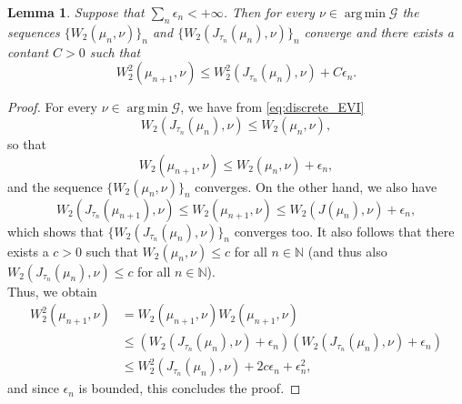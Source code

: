 \documentclass[11pt]{article}
\DeclareMathOperator*{\argmin}{arg\,min}
\newtheorem{lemma}[theorem]{Lemma}
\newcommand{\cG}{\mathcal{G}}
\newcommand{\N}{\mathbb{N}}
\numberwithin{equation}{section}
\begin{document}
\begin{lemma}\label{lem:bounded_sequences}
	Suppose that $\sum_n \epsilon_n < +\infty$. Then for every $\nu \in \argmin \cG$ the sequences $\{W_2(\mu_n,\nu)\}_n$ and $\{W_2(J_{\tau_n}(\mu_n),\nu)\}_n$ converge and there exists a contant $C>0$ such that
	\begin{equation}\label{eq:square_inequality}
		W_2^2(\mu_{n+1},\nu)\leq W_2^2(J_{\tau_n}(\mu_n),\nu)+C\epsilon_n.
	\end{equation}
\end{lemma}
\begin{proof}
	For every $\nu \in \argmin \cG$, we have from \eqref{eq:discrete_EVI} \[W_2(J_{\tau_n}(\mu_n),\nu)\leq  W_2(\mu_n,\nu),\] so that
	\[W_2(\mu_{n+1},\nu)\leq W_2(\mu_n,\nu) + \epsilon_n,\]
	and the sequence $\{W_2(\mu_n,\nu)\}_n$ converges. On the other hand, we also have
	\[W_2(J_{\tau_n}(\mu_{n+1}),\nu)\leq W_2(\mu_{n+1},\nu)\leq W_2(J(\mu_{n}),\nu)+\epsilon_{n},\]
	which shows that $\{W_2(J_{\tau_n}(\mu_n),\nu)\}_n$ converges too. It also follows that there exists a $c>0$ such that $W_2(\mu_n,\nu)\leq c $ for all $n\in \N$ (and thus also $W_2(J_{\tau_n}(\mu_n),\nu)\leq c $ for all $n\in \N$).\\
	Thus, we obtain
	\begin{equation*}
		\begin{aligned}
			W_2^2(\mu_{n+1},\nu) & = W_2(\mu_{n+1},\nu)W_2(\mu_{n+1},\nu)\\
			&\leq (W_2(J_{\tau_n}(\mu_n),\nu) +\epsilon_n)(W_2(J_{\tau_n}(\mu_n),\nu) +\epsilon_n)\\
			& \leq W_2^2(J_{\tau_n}(\mu_n),\nu) + 2 c \epsilon_n + \epsilon_n^2,
		\end{aligned}
	\end{equation*}
	and since $\epsilon_n$ is bounded, this concludes the proof.
\end{proof}
\end{document}
